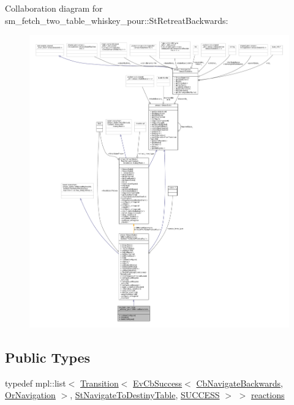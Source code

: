 Collaboration diagram for sm\+\_\+fetch\+\_\+two\+\_\+table\+\_\+whiskey\+\_\+pour\+:\+:St\+Retreat\+Backwards\+:
\nopagebreak
\begin{figure}[H]
\begin{center}
\leavevmode
\includegraphics[width=350pt]{structsm__fetch__two__table__whiskey__pour_1_1StRetreatBackwards__coll__graph}
\end{center}
\end{figure}
\subsection*{Public Types}
\begin{DoxyCompactItemize}
\item 
typedef mpl\+::list$<$ \hyperlink{classsmacc_1_1Transition}{Transition}$<$ \hyperlink{structsmacc_1_1EvCbSuccess}{Ev\+Cb\+Success}$<$ \hyperlink{classcl__move__base__z_1_1CbNavigateBackwards}{Cb\+Navigate\+Backwards}, \hyperlink{classsm__fetch__two__table__whiskey__pour_1_1OrNavigation}{Or\+Navigation} $>$, \hyperlink{structsm__fetch__two__table__whiskey__pour_1_1StNavigateToDestinyTable}{St\+Navigate\+To\+Destiny\+Table}, \hyperlink{structsmacc_1_1default__transition__tags_1_1SUCCESS}{S\+U\+C\+C\+E\+SS} $>$ $>$ \hyperlink{structsm__fetch__two__table__whiskey__pour_1_1StRetreatBackwards_a78d6f52a57f100aa0a805788957df9e0}{reactions}
\end{DoxyCompactItemize}
